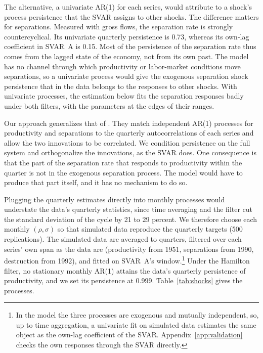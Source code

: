 \documentclass[authoryear, review, 12pt]{elsarticle}
\begin{document}
The alternative, a univariate AR(1) for each series, would attribute to a shock's process persistence that the SVAR assigns to other shocks. The difference matters for separations. Measured with gross flows, the separation rate is strongly countercyclical. Its univariate quarterly persistence is 0.73, whereas its own-lag coefficient in SVAR~A is 0.15. Most of the persistence of the separation rate thus comes from the lagged state of the economy, not from its own past. The model has no channel through which productivity or labor-market conditions move separations, so a univariate process would give the exogenous separation shock persistence that in the data belongs to the responses to other shocks. With univariate processes, the estimation below fits the separation responses badly under both filters, with the parameters at the edges of their ranges.

Our approach generalizes that of \citet{coles_2018}. They match independent AR(1) processes for productivity and separations to the quarterly autocorrelations of each series and allow the two innovations to be correlated. We condition persistence on the full system and orthogonalize the innovations, as the SVAR does. One consequence is that the part of the separation rate that responds to productivity within the quarter is not in the exogenous separation process. The model would have to produce that part itself, and it has no mechanism to do so.

Plugging the quarterly estimates directly into monthly processes would understate the data's quarterly statistics, since time averaging and the filter cut the standard deviation of the cycle by 21 to 29 percent.
We therefore choose each monthly $(\rho,\sigma)$ so that simulated data reproduce the quarterly targets (500 replications). The simulated data are averaged to quarters, filtered over each series' own span as the data are (productivity from 1951, separations from 1990, destruction from 1992), and fitted on SVAR~A's window.\footnote{In the model the three processes are exogenous and mutually independent, so, up to time aggregation, a univariate fit on simulated data estimates the same object as the own-lag coefficient of the SVAR. Appendix~\ref{app:validation} checks the own responses through the SVAR directly.} Under the Hamilton filter, no stationary monthly AR(1) attains the data's quarterly persistence of productivity, and we set its persistence at 0.999. Table~\ref{tab:shocks} gives the processes.
\end{document}
